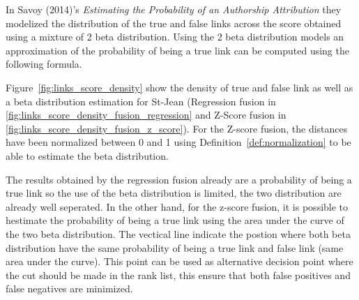 In Savoy (2014)'s \textit{Estimating the Probability of an Authorship Attribution} they modelized the distribution of the true and false links across the score obtained using a mixture of 2 beta distribution.
Using the 2 beta distribution models an approximation of the probability of being a true link can be computed using the following formula.

Figure~\ref{fig:links_score_density} show the density of true and false link as well as a beta distribution estimation for St-Jean (Regression fusion in \ref{fig:links_score_density_fusion_regression} and Z-Score fusion in \ref{fig:links_score_density_fusion_z_score}).
For the Z-score fusion, the distances have been normalized between 0 and 1 using Definition~\ref{def:normalization} to be able to estimate the beta distribution.

The results obtained by the regression fusion already are a probability of being a true link so the use of the beta distribution is limited, the two distribution are already well seperated.
In the other hand, for the z-score fusion, it is possible to hestimate the probability of being a true link using the area under the curve of the two beta distribution.
The vectical line indicate the postion where both beta distribution have the same probability of being a true link and false link (same area under the curve).
This point can be used as alternative decision point where the cut should be made in the rank list, this ensure that both false positives and false negatives are minimized.

